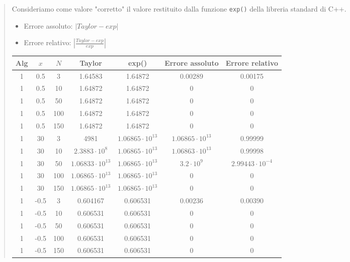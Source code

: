 \documentclass[10pt]{article}
\begin{document}
\begin{quote}
    Consideriamo come valore "corretto" il valore restituito dalla funzione \texttt{exp()} della libreria standard di C++.
    \begin{itemize}
        \item Errore assoluto: $|Taylor-exp|$
        \item Errore relativo: $\left |\frac{Taylor-exp}{exp}\right |$
    \end{itemize}
    \begin{tabular}{| c | c | c | c | c | c | c |}
        \hline
        \textbf{Alg} & \textbf{$x$} & \textbf{$N$} & \textbf{Taylor} & \textbf{exp()} & \textbf{Errore assoluto} & \textbf{Errore relativo}\\
        \hline
        1 & 0.5 & 3 & 1.64583 & 1.64872 & 0.00289 & 0.00175 \\
        \hline
        1 & 0.5 & 10 & 1.64872 & 1.64872 & 0 & 0 \\
        \hline
        1 & 0.5 & 50 & 1.64872 & 1.64872 & 0 & 0 \\
        \hline 
        1 & 0.5 & 100 & 1.64872 & 1.64872 & 0 & 0 \\
        \hline
        1 & 0.5 & 150 & 1.64872 & 1.64872 & 0 & 0 \\
        \hline
        1 & 30 & 3 & 4981 & $1.06865\cdot10^{13}$ & $1.06865\cdot10^{13}$ & 0.99999 \\
        \hline
        1 & 30 & 10 & $2.3883\cdot10^{8}$ & $1.06865\cdot10^{13}$ & $1.06863\cdot10^{13}$ & 0.99998 \\
        \hline
        1 & 30 & 50 & $1.06833\cdot10^{13}$ & $1.06865\cdot10^{13}$ & $3.2\cdot10^{9}$ & $2.99443\cdot10^{-4}$ \\
        \hline
        1 & 30 & 100 & $1.06865\cdot10^{13}$ & $1.06865\cdot10^{13}$ & 0 & 0 \\
        \hline
        1 & 30 & 150 & $1.06865\cdot10^{13}$ & $1.06865\cdot10^{13}$ & 0 & 0 \\
        \hline
        1 & -0.5 & 3 & 0.604167 & 0.606531 & 0.00236 & 0.00390 \\
        \hline
        1 & -0.5 & 10 & 0.606531 & 0.606531 & 0 & 0 \\
        \hline
        1 & -0.5 & 50 & 0.606531 & 0.606531 & 0 & 0 \\
        \hline
        1 & -0.5 & 100 & 0.606531 & 0.606531 & 0 & 0 \\
        \hline
        1 & -0.5 & 150 & 0.606531 & 0.606531 & 0 & 0 \\

\end{tabular}
\end{quote}
\end{document}

